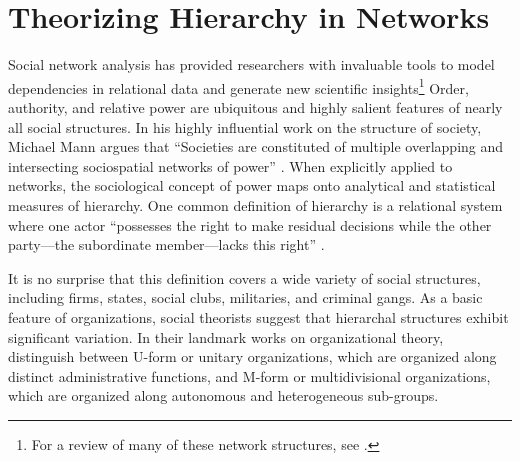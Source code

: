 \documentclass[3p,times]{elsarticle}
\begin{document}

 

\section{Theorizing Hierarchy in Networks}
Social network analysis has provided researchers with invaluable tools to model dependencies in relational data and generate new scientific insights\footnote{For a review of many of these network structures, see \cite{smith2005networks}.} Order, authority, and relative power are ubiquitous and highly salient features of nearly all social structures. In his highly influential work on the structure of society, Michael Mann argues that ``Societies are constituted of multiple overlapping and intersecting sociospatial networks of power'' \cite{mann}. When explicitly applied to networks, the sociological concept of power maps onto analytical and statistical measures of hierarchy. One common definition of hierarchy is  a relational system where one actor ``possesses the right to make residual decisions while the other party---the subordinate member---lacks this right'' \cite{cooley, lake}.

It is no surprise that this definition covers a wide variety of social structures, including firms, states, social clubs, militaries, and criminal gangs. As a basic feature of organizations, social theorists suggest that hierarchal structures exhibit significant variation. In their landmark works on organizational theory, \cite{williamson, chandler, cooley} distinguish between U-form or unitary organizations, which are organized along distinct administrative functions, and M-form or multidivisional organizations, which are organized along autonomous and heterogeneous sub-groups.  
\end{document}
